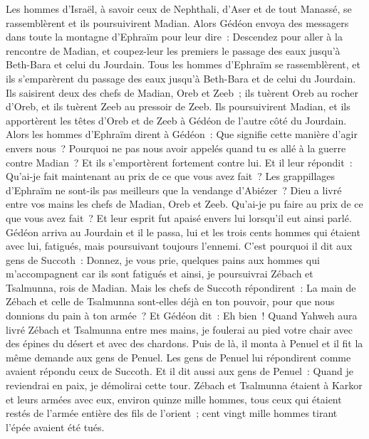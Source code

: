 \begin{multicols}{2}
Les hommes d'Israël, à savoir ceux de Nephthali, d'Aser et de tout Manassé, se rassemblèrent et ils poursuivirent Madian.
Alors Gédéon envoya des messagers dans toute la montagne d'Ephraïm pour leur dire~: Descendez pour aller à la rencontre de Madian, et coupez-leur les premiers le passage des eaux jusqu'à Beth-Bara et celui du Jourdain. Tous les hommes d'Ephraïm se rassemblèrent, et ils s'emparèrent du passage des eaux jusqu'à Beth-Bara et de celui du Jourdain.
Ils saisirent deux des chefs de Madian, Oreb et Zeeb~; ils tuèrent Oreb au rocher d'Oreb, et ils tuèrent Zeeb au pressoir de Zeeb. Ils poursuivirent Madian, et ils apportèrent les têtes d'Oreb et de Zeeb à Gédéon de l'autre côté du Jourdain.
\VerseOne{}Alors les hommes d'Ephraïm dirent à Gédéon~: Que signifie cette manière d'agir envers nous~? Pourquoi ne pas nous avoir appelés quand tu es allé à la guerre contre Madian~? Et ils s'emportèrent fortement contre lui.
Et il leur répondit~: Qu'ai-je fait maintenant au prix de ce que vous avez fait~? Les grappillages d'Ephraïm ne sont-ils pas meilleurs que la vendange d'Abiézer~?
Dieu a livré entre vos mains les chefs de Madian, Oreb et Zeeb. Qu'ai-je pu faire au prix de ce que vous avez fait~? Et leur esprit fut apaisé envers lui lorsqu'il eut ainsi parlé.
Gédéon arriva au Jourdain et il le passa, lui et les trois cents hommes qui étaient avec lui, fatigués, mais poursuivant toujours l'ennemi.
C'est pourquoi il dit aux gens de Succoth~: Donnez, je vous prie, quelques pains aux hommes qui m'accompagnent car ils sont fatigués et ainsi, je poursuivrai Zébach et Tsalmunna, rois de Madian.
Mais les chefs de Succoth répondirent~: La main de Zébach et celle de Tsalmunna sont-elles déjà en ton pouvoir, pour que nous donnions du pain à ton armée~?
Et Gédéon dit~: Eh bien~! Quand Yahweh aura livré Zébach et Tsalmunna entre mes mains, je foulerai au pied votre chair avec des épines du désert et avec des chardons.
Puis de là, il monta à Penuel et il fit la même demande aux gens de Penuel. Les gens de Penuel lui répondirent comme avaient répondu ceux de Succoth.
Et il dit aussi aux gens de Penuel~: Quand je reviendrai en paix, je démolirai cette tour.
Zébach et Tsalmunna étaient à Karkor et leurs armées avec eux, environ quinze mille hommes, tous ceux qui étaient restés de l'armée entière des fils de l'orient~; cent vingt mille hommes tirant l'épée avaient été tués.

\end{multicols}
